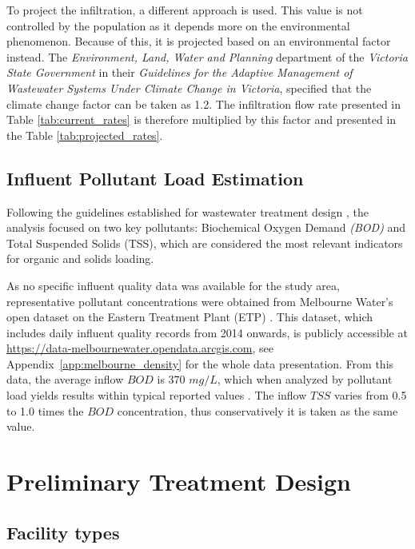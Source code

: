 \documentclass[11pt]{article}
\begin{document}
To project the infiltration, a different approach is used. This value is not controlled by
the population as it depends more on the environmental phenomenon. Because of this, it is projected
based on an environmental factor instead. The \textit{Environment, Land, Water and Planning} department
of the \textit{Victoria State Government} in their \textit{Guidelines for the Adaptive Management of 
Wastewater Systems Under Climate Change in Victoria}, specified that the climate change factor
can be taken as 1.2. The infiltration flow rate presented in Table \ref{tab:current_rates} is therefore multiplied by this
factor and presented in the Table \ref{tab:projected_rates}.




\subsection{Influent Pollutant Load Estimation}
\label{sec:pollutant_load}

Following the guidelines established for wastewater treatment design 
\cite{wef_DesignWaterResource, metcalf_2014_wastewater}, the analysis focused on two key 
pollutants: Biochemical Oxygen Demand \textit{(BOD)} and Total Suspended Solids (TSS), which 
are considered the most relevant indicators for organic and solids loading.

As no specific influent quality data was available for the study area, 
representative pollutant concentrations were obtained from Melbourne Water’s open 
dataset on the Eastern Treatment Plant (ETP) \cite{melbournewater_2024_etpdata}. 
This dataset, which includes daily influent quality records from 2014 onwards, is 
publicly accessible at \url{https://data-melbournewater.opendata.arcgis.com}, see Appendix~\ref{app:melbourne_density} 
for the whole data presentation. From this data, the average inflow $BOD$ is 370
$mg/L$, which when analyzed by pollutant load yields results within typical reported 
values \cite{metcalf_2014_wastewater}. The inflow $TSS$ varies from 0.5 to 1.0 times 
the $BOD$ concentration, thus conservatively it is taken as the same value.


\section{Preliminary Treatment Design}
\label{sec:prelim_treatment}

\subsection{Facility types}
\label{sec:preliminary_facility_types}
\end{document}
